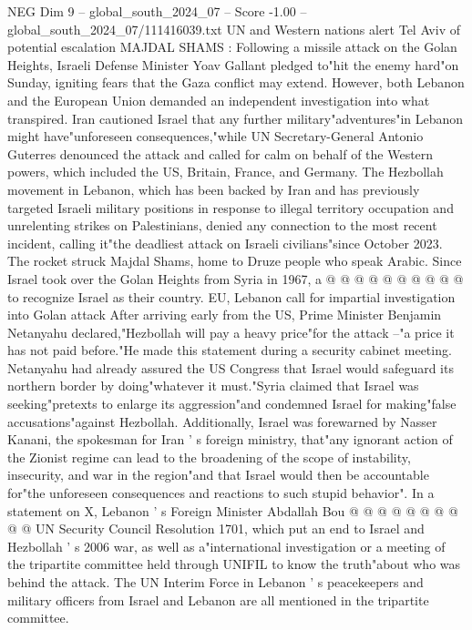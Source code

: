 \begin{textsample}{NEG Dim 9 – global\_south\_2024\_07 – Score -1.00 – global\_south\_2024\_07/111416039.txt}  \label{ex:f9_neg_351}
UN and Western nations alert Tel Aviv of potential escalation MAJDAL SHAMS : Following a missile attack on the Golan Heights, Israeli Defense Minister Yoav Gallant pledged to"hit the enemy hard"on Sunday, igniting fears that the Gaza conflict may extend.
However, both Lebanon and the European Union demanded an independent investigation into what transpired.
Iran cautioned Israel that any further military"adventures"in Lebanon might have"unforeseen consequences,"while UN Secretary-General Antonio Guterres denounced the attack and called for calm on behalf of the Western powers, which included the US, Britain, France, and Germany.
The Hezbollah movement in Lebanon, which has been backed by Iran and has previously targeted Israeli military positions in response to illegal territory occupation and unrelenting strikes on Palestinians, denied any connection to the most recent incident, calling it"the deadliest attack on Israeli civilians"since October 2023.
The rocket struck Majdal Shams, home to Druze people who speak Arabic.
Since Israel took over the Golan Heights from Syria in 1967, a @ @ @ @ @ @ @ @ @ @ to recognize Israel as their country.
EU, Lebanon call for impartial investigation into Golan attack After arriving early from the US, Prime Minister Benjamin Netanyahu declared,"Hezbollah will pay a heavy price"for the attack --"a price it has not paid before."He made this statement during a security cabinet meeting.
Netanyahu had already assured the US Congress that Israel would safeguard its northern border by doing"whatever it must."Syria claimed that Israel was seeking"pretexts to enlarge its aggression"and condemned Israel for making"false accusations"against Hezbollah.
Additionally, Israel was forewarned by Nasser Kanani, the spokesman for Iran ' s foreign ministry, that"any ignorant action of the Zionist regime can lead to the broadening of the scope of instability, insecurity, and war in the region"and that Israel would then be accountable for"the unforeseen consequences and reactions to such stupid behavior".
In a statement on X, Lebanon ' s Foreign Minister Abdallah Bou @ @ @ @ @ @ @ @ @ @ UN Security Council Resolution 1701, which put an end to Israel and Hezbollah ' s 2006 war, as well as a"international investigation or a meeting of the tripartite committee held through UNIFIL to know the truth"about who was behind the attack.
The UN Interim Force in Lebanon ' s peacekeepers and military officers from Israel and Lebanon are all mentioned in the tripartite committee.

\end{textsample}
